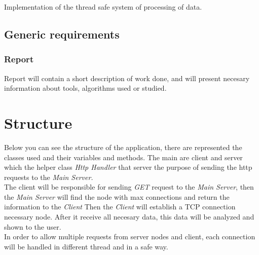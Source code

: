 \documentclass[12pt]{article}
\begin{document}
  Implementation of the thread safe system of processing of data.

  \subsection{Generic requirements}

  \subsubsection{Report}

  Report will contain a short description of work done, and will present necesary information
  about tools, algorithms used or studied.

  
  \section{Structure}

    Below you can see the structure of the application, there are represented the classes used 
    and their variables and methods. The main are client and server which the helper class 
    \textit{Http Handler} that server the purpose of sending the http requests to the \textit{Main Server.} \\

    The client will be responsible for sending \textit{GET} request to the \textit{Main Server}, then the 
    \textit{Main Server} will find the node with max connections and return the information to the \textit{Client}
    Then the \textit{Client} will establish a TCP connection necessary node. After it receive all necesary data, this 
    data will be analyzed and shown to the user. \\ 

    In order to allow multiple requests from server nodes and client, each connection will be handled in different
    thread and in a safe way.
\end{document}
